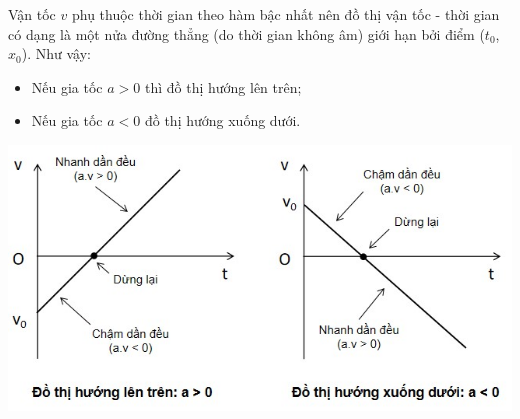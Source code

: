 \setcounter{section}{0}
Vận tốc $v$ phụ thuộc thời gian theo hàm bậc nhất nên đồ thị vận tốc - thời gian có dạng là một nửa đường thẳng (do thời gian không âm) giới hạn bởi điểm ($t_0$, $x_0$). Như vậy:
\begin{itemize}
	\item Nếu gia tốc $a>0$ thì đồ thị hướng lên trên;
	\item Nếu gia tốc $a<0$ đồ thị hướng xuống dưới.
\end{itemize}
\begin{center}
	\includegraphics[scale=0.8]{../figs/VN10-PH-04-L-003-3-V2-01.jpg}
\end{center}	
\setcounter{viduii}{0}
